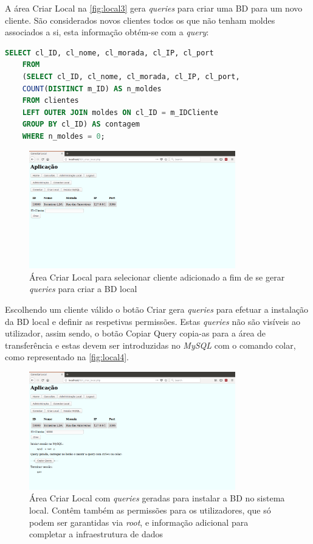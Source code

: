 \documentclass[11pt,twoside,a4paper]{report}
\begin{document}
A área Criar Local na \autoref{fig:local3} gera \textit{queries} para criar uma BD para um novo cliente. São considerados novos clientes todos os que não tenham moldes associados a si, esta informação obtém-se com a \textit{query}:
\begin{lstlisting}[language = SQL]
	SELECT cl_ID, cl_nome, cl_morada, cl_IP, cl_port
	FROM
	(SELECT cl_ID, cl_nome, cl_morada, cl_IP, cl_port,
	COUNT(DISTINCT m_ID) AS n_moldes
	FROM clientes
	LEFT OUTER JOIN moldes ON cl_ID = m_IDCliente
	GROUP BY cl_ID) AS contagem
	WHERE n_moldes = 0;
\end{lstlisting}
\begin{figure}[H]
	\centering
	\includegraphics[trim={0 11cm 0 0},clip,width=0.8\textwidth]{local02} %
	\caption[Área Criar Local]{Área Criar Local para selecionar cliente adicionado a fim de se gerar \textit{queries} para criar a BD local}
	\label{fig:local3}
\end{figure}
Escolhendo um cliente válido o botão Criar gera \textit{queries} para efetuar a instalação da BD local e definir as respetivas permissões. Estas \textit{queries} não são visíveis ao utilizador, assim sendo, o botão Copiar Query copia-as para a área de transferência e estas devem ser introduzidas no \textit{MySQL} com o comando colar, como representado na \autoref{fig:local4}.
\begin{figure}[H]
	\begin{center}
		\includegraphics[trim={0 2cm 0 0},clip,width=0.8\textwidth]{local03} %
		\caption[Área Criar Local com \textit{queries geradas}]{Área Criar Local com \textit{queries} geradas para instalar a BD no sistema local. Contêm também as permissões para os utilizadores, que só podem ser garantidas via \textit{root}, e informação adicional para completar a infraestrutura de dados}
		\label{fig:local4}
	\end{center}
\end{figure}
\end{document}

